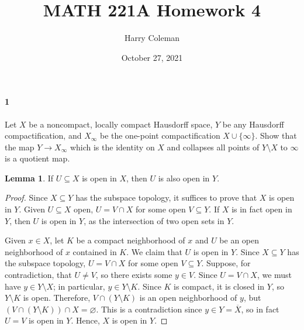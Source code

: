 \documentclass[12pt]{article}
\renewcommand{\maketitle}{\thispagestyle{title}}
\newlength{\myparskip}
\newenvironment{fullbox}{\begin{lrbox}{\savefullbox}\begin{minipage}{\dimexpr\textwidth-2\fboxsep\relax}\setlength{\parskip}{\myparskip}}{\end{minipage}\end{lrbox}\framebox[\textwidth]{\usebox{\savefullbox}}}
\newenvironment{pbox}[1][]{\begin{fullbox}\ifx#1\empty\else\paragraph{#1}\fi}{\end{fullbox}}
\renewcommand{\emptyset}{\varnothing}
\newcommand{\<}{\langle}
\renewcommand{\>}{\rangle}
\newcommand{\clo}{\overline}
\theoremstyle{definition}
\newtheorem{lemma}{Lemma}
\begin{document}
\title{MATH 221A Homework 4}
\author{Harry Coleman}
\date{October 27, 2021}
\maketitle

\begin{pbox}[1]
    Let $X$ be a noncompact, locally compact Hausdorff space, $Y$ be any
  Hausdorff compactification, and $X_\infty$ be the one-point compactification
  $X \cup \{\infty\}$.  Show that the map $Y \to X_\infty$ which is the identity
  on $X$ and collapses all points of $Y \setminus X$ to $\infty$ is a quotient
  map.
\end{pbox}

\begin{lemma}
    If $U \subseteq X$ is open in $X$, then $U$ is also open in $Y$.
\end{lemma}

\begin{proof}
    Since $X \subseteq Y$ has the subspace topology, it suffices to prove that $X$ is open in $Y$. Given $U \subseteq X$ open, $U = V \cap X$ for some open $V \subseteq Y$. If $X$ is in fact open in $Y$, then $U$ is open in $Y$, as the intersection of two open sets in $Y$.

    Given $x \in X$, let $K$ be a compact neighborhood of $x$ and $U$ be an open neighborhood of $x$ contained in $K$. We claim that $U$ is open in $Y$. Since $X \subseteq Y$ has the subspace topology, $U = V \cap X$ for some open $V \subseteq Y$. Suppose, for contradiction, that $U \ne V$, so there exists some $y \in V$. Since $U = V \cap X$, we must have $y \in Y \setminus X$; in particular, $y \in Y \setminus K$. Since $K$ is compact, it is closed in $Y$, so $Y \setminus K$ is open. Therefore, $V \cap (Y \setminus K)$ is an open neighborhood of $y$, but $(V \cap (Y \setminus K)) \cap X = \emptyset$. This is a contradiction since $y \in Y = \clo{X}$, so in fact $U = V$ is open in $Y$. Hence, $X$ is open in $Y$.

\end{proof}
\end{document}
